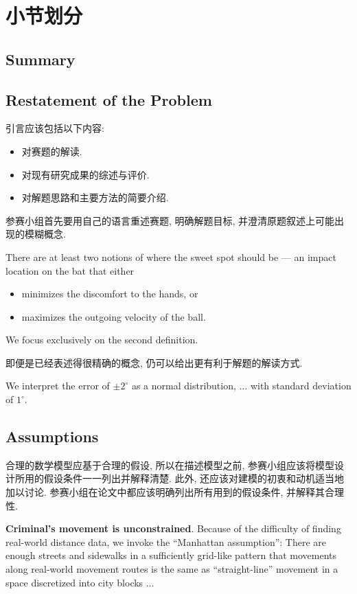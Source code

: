 \documentclass[openany]{ctexbook}
\newenvironment{example}{\begin{tcolorbox}[title=Example]}{\end{tcolorbox}}
\begin{document}
\tableofcontents\clearpage


\chapter{小节划分}
    \section*{Summary}
    \lipsum[1]

    \section{Restatement of the Problem}
    引言应该包括以下内容:
    \begin{itemize}
    	\item 对赛题的解读.
    	\item 对现有研究成果的综述与评价.
    	\item 对解题思路和主要方法的简要介绍.
    \end{itemize}
    参赛小组首先要用自己的语言重述赛题, 明确解题目标, 并澄清原题叙述上可能出现的模糊概念.
    \begin{example}
        There are at least two notions of where the sweet spot should be --- an impact location on the bat that either
        \begin{itemize}
        	\item minimizes the discomfort to the hands, or
        	\item maximizes the outgoing velocity of the ball.
        \end{itemize}
        We focus exclusively on the second definition.
    \end{example}
    即便是已经表述得很精确的概念, 仍可以给出更有利于解题的解读方式.
    \begin{example}
        We interpret the error of $\pm 2^\circ$ as a normal distribution, $\ldots$ with standard deviation of $1^\circ$.
    \end{example}


    \section{Assumptions}
    合理的数学模型应基于合理的假设, 所以在描述模型之前, 参赛小组应该将模型设计所用的假设条件一一列出并解释清楚. 此外, 还应该对建模的初衷和动机适当地加以讨论. 参赛小组在论文中都应该明确列出所有用到的假设条件, 并解释其合理性.
    \begin{example}
        \textbf{Criminal's movement is unconstrained}. Because of the difficulty of finding real-world distance data, we invoke the ``Manhattan assumption'': There are enough streets and sidewalks in a sufficiently grid-like pattern that movements along real-world movement routes is the same as ``straight-line'' movement in a space discretized into city blocks $\ldots$
    \end{example}
\end{document}
